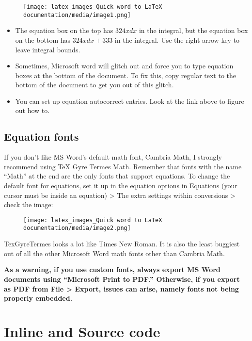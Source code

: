 \documentclass[
]{article}
\theoremstyle{plain}
\theoremstyle{remark}
\theoremstyle{definition}
\begin{document}
\begin{figure}[H]
\centering
\texttt{[image: latex\_images\_Quick word to LaTeX documentation/media/image1.png]}
\end{figure}

\begin{itemize}
\item
  The equation box on the top has \(324xdx\) in the integral, but the
  equation box on the bottom has \(324xdx + 333\) in the integral. Use
  the right arrow key to leave integral bounds.
\item
  Sometimes, Microsoft word will glitch out and force you to type
  equation boxes at the bottom of the document. To fix this, copy
  regular text to the bottom of the document to get you out of this
  glitch.
\item
  You can set up equation autocorrect entries. Look at the link above to
  figure out how to.
\end{itemize}


\subsection{Equation fonts}

If you don't like MS Word's default math font, Cambria Math, I strongly
recommend using
\href{https://ctan.org/pkg/tex-gyre-math-termes?lang=en}{TeX Gyre Termes
Math.} Remember that fonts with the name ``Math'' at the end are the
only fonts that support equations. To change the default font for
equations, set it up in the equation options in Equations (your cursor
must be inside an equation) \textgreater{} The extra settings within
conversions \textgreater{} check the image:


\begin{figure}[H]
\centering
\texttt{[image: latex\_images\_Quick word to LaTeX documentation/media/image2.png]}
\end{figure}

TexGyreTermes looks a lot like Times New Roman. It is also the least
buggiest out of all the other Microsoft Word math fonts other than
Cambria Math.

\textbf{As a warning, if you use custom fonts, always export MS Word
documents using ``Microsoft Print to PDF.'' Otherwise, if you export as
PDF from File \textgreater{} Export, issues can arise, namely fonts not
being properly embedded.}


\section{Inline and Source code}
\end{document}
